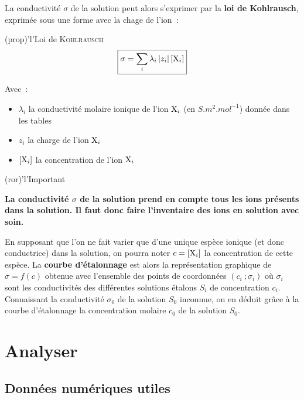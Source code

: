 \documentclass[../main/main.tex]{subfiles}
\begin{document}
La conductivité $\sigma$ de la solution peut alors s'exprimer par la \textbf{loi
	de Kohlrausch}, exprimée sous une forme avec la chage de l'ion~:
\begin{tcb}(prop)'l'{Loi de \textsc{Kohlrausch}}
	\[\boxed{\sigma = \sum_{i} \lambda_i \left|z_i\right| [{\rm X}_i]}\]

	Avec~:
	\begin{itemize}
		\item $\lambda_i$ la conductivité molaire ionique de l'ion ${\rm X}_i$ (en
		      $\si{S.m^2.mol^{-1}}$) donnée dans les tables
		\item $z_i$ la charge de l'ion ${\rm X}_i$
		\item $[{\rm X}_i]$ la concentration de l'ion ${\rm X}_i$
	\end{itemize}
\end{tcb}

\begin{tcb}(ror)'l'{Important}
	\begin{center}
		\bfseries
		La conductivité $\sigma$ de la solution prend en compte tous les ions
		présents dans la solution. Il faut donc faire l'inventaire des ions en
		solution avec soin.
	\end{center}
\end{tcb}

En supposant que l'on ne fait varier que d'une unique espèce ionique (et donc
conductrice) dans la solution, on pourra noter $c = [{\rm X}_i]$ la
concentration de cette espèce. La \textbf{courbe d'étalonnage} est alors la
représentation graphique de $\sigma = f(c)$ obtenue avec l'ensemble des points
de coordonnées $(c_i~; \sigma_i)$ où $\sigma_i$ sont les conductivités des
différentes solutions étalons $S_i$ de concentration $c_i$. Connaissant la
conductivité $\sigma_0$ de la solution $S_0$ inconnue, on en déduit grâce à la
courbe d'étalonnage la concentration molaire $c_0$ de la solution $S_0$.

\section{Analyser}
\subsection{Données numériques utiles}
\end{document}
